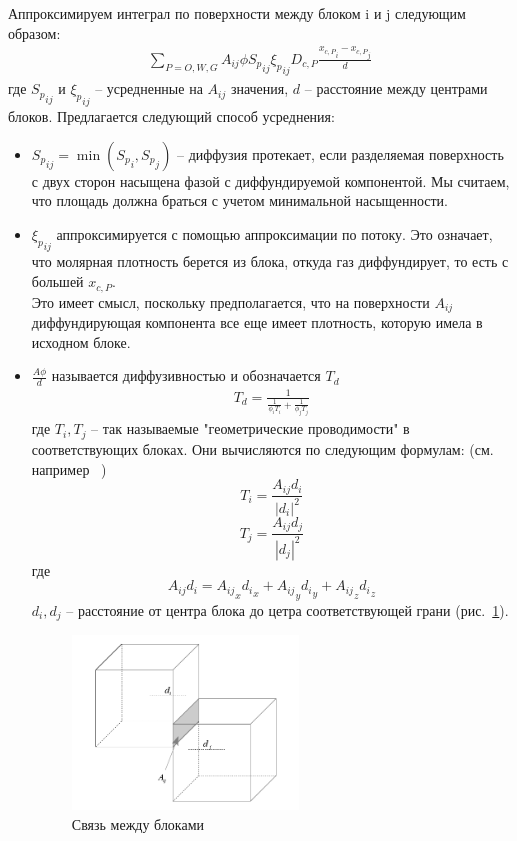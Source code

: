 \documentclass[12pt,a4paper]{article}
\begin{document}
Аппроксимируем интеграл по поверхности между блоком i и j следующим образом:
\begin{eqnarray}
  \sum\limits_{P = O, W, G}{A_{ij}\phi {S_p}_{ij}{\xi_p}_{ij}D_{c,P}\frac{{x_{c,P}}_i - {x_{c,P}}_j}{d}}
\end{eqnarray}
где ${S_p}_{ij}$ и ${\xi_p}_{ij}$ -- усредненные на $A_{ij}$ значения, $d$ -- расстояние между центрами блоков. Предлагается следующий способ усреднения:
\begin{itemize}
\item ${S_p}_{ij} = \min({S_p}_i, {S_p}_j)$ -- диффузия протекает, если разделяемая поверхность с двух сторон насыщена фазой с диффундируемой компонентой. Мы считаем, что площадь должна браться с учетом минимальной насыщенности.
\item ${\xi_p}_{ij}$ аппроксимируется с помощью аппроксимации по потоку. Это означает, что молярная плотность берется из блока, откуда газ диффундирует, то есть с большей $x_{c,P}$.\\Это имеет смысл, поскольку предполагается, что на поверхности $A_{ij}$ диффундирующая компонента все еще имеет плотность, которую имела в исходном блоке. 
\item $\frac{A\phi}{d}$ называется диффузивностью и обозначается $T_d$
\begin{eqnarray}
T_d= \frac{1}{\frac{1}{{\phi}_iT_i} + \frac{1}{{\phi}_jT_j}} 
\end{eqnarray}
где $T_i,T_j$ -- так называемые "геометрические проводимости" в соответствующих блоках.
Они вычисляются по следующим формулам: (см. например ~\cite{Chen})
$$T_i=\frac{A_{ij}d_i}{{|d_i|}^2}$$
$$T_j=\frac{A_{ij}d_j}{{|d_j|}^2}$$
где
$$A_{ij}d_i={A_{ij}}_x{d_i}_x + {A_{ij}}_y{d_i}_y + {A_{ij}}_z{d_i}_z$$
$d_i, d_j$ -- расстояние от центра блока до цетра соответствующей грани (рис.~\ref{links}).
\begin{figure}
\begin{center}
\includegraphics[width=6cm]{pics/link_2.png}
\caption{Связь между блоками}
\end{center}
 \label{links}
\end{figure}
\end{itemize}
\end{document}

